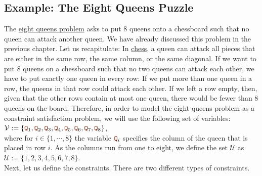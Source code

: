\subsection{Example: The Eight Queens Puzzle}
The \href{https://en.wikipedia.org/wiki/Eight_queens_puzzle}{eight queens problem} asks to put 8 queens onto a
chessboard such that no queen can attack another queen.  We have already discussed this problem in the previous
chapter.  Let us recapitulate: In \href{https://en.wikipedia.org/wiki/Chess}{chess},
a queen can attack all pieces that are either in the same row, the same column, or the same diagonal.  If we
want to put 8 queens on a chessboard such that no two queens can attack each other, we have to put exactly one
queen in every row:  If we put more than one queen in a row, the queens in that row could attack each other.
If we left a row empty, then, given that the other rows contain at most one queen, there would be fewer
than 8 queens on the board.  Therefore, in order to model the eight queens problem as a constraint satisfaction
problem, we will use the following set of variables:
\\[0.2cm]
\hspace*{1.3cm}
$\mathcal{V} := \{ \mytt{Q}_1, \mytt{Q}_2, \mytt{Q}_3, \mytt{Q}_4, \mytt{Q}_5, \mytt{Q}_6, \mytt{Q}_7,\mytt{Q}_8 \}$,
\\[0.2cm]
where for $i \in \{1,\cdots,8\}$ the variable $\mytt{Q}_i$ specifies the column of the queen that is placed in
row $i$.   As the columns run from one to eight, we define the set $\mathcal{U}$ as
\\[0.2cm]
\hspace*{1.3cm}
$\mathcal{U} := \{1,2,3,4,5,6,7,8\}$.
\\[0.2cm]
Next, let us define the constraints.  There are two different types of constraints.
